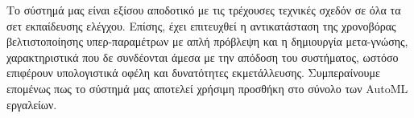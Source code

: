 Το σύστημά μας είναι εξίσου αποδοτικό με τις τρέχουσες τεχνικές σχεδόν σε όλα τα σετ εκπαίδευσης ελέγχου. Επίσης, έχει επιτευχθεί η αντικατάσταση της χρονοβόρας βελτιστοποίησης υπερ-παραμέτρων με απλή πρόβλεψη και η δημιουργία μετα-γνώσης, χαρακτηριστικά που δε συνδέονται άμεσα με την απόδοση του συστήματος, ωστόσο επιφέρουν υπολογιστικά οφέλη και δυνατότητες εκμετάλλευσης. Συμπεραίνουμε επομένως πως το σύστημά μας αποτελεί χρήσιμη προσθήκη στο σύνολο των \gls{AutoML} εργαλείων. 